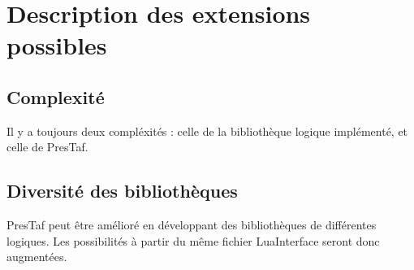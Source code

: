 \section{Description des extensions possibles}

\subsection{Complexité}

Il y a toujours deux compléxités : celle de la bibliothèque logique implémenté, et celle de PresTaf.

\subsection{Diversité des bibliothèques}

PresTaf peut être amélioré en développant des bibliothèques de différentes logiques. Les possibilités à partir du même fichier LuaInterface seront donc augmentées.
